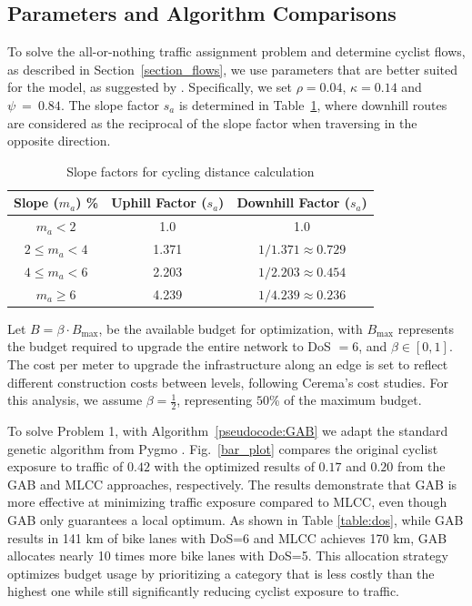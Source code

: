 \documentclass[letterpaper, 10 pt, conference]{ieeeconf}  %
\begin{document}
 \subsection{Parameters and Algorithm Comparisons}
To solve the all-or-nothing traffic assignment problem and determine cyclist flows, as described in Section~\ref{section_flows}, we use parameters that are better suited for the model, as suggested by \cite{cooper2017using}. Specifically, we set $\rho = 0.04$, $\kappa = 0.14$ and $\psi~=~0.84$. The slope factor $s_{a}$ is determined in Table~\ref{table:slope_factors}, where downhill routes are considered as the reciprocal of the slope factor when traversing in the opposite direction.
\begin{table}[h!]
\centering
\begin{tabular}{c|c|c}
\hline
Slope ($m_a$) \% & Uphill Factor ($s_a$) & Downhill Factor ($s_a$) \\ \hline
$m_a < 2$ & 1.0 & 1.0 \\ 
$2 \leq m_a < 4$ & 1.371 & $1/1.371 \approx 0.729$ \\ 
$4 \leq m_a < 6$ & 2.203 & $1/2.203 \approx 0.454$ \\ 
$m_a \geq 6$ & 4.239 & $1/4.239 \approx 0.236$ \\ \hline
\end{tabular}
\caption{\footnotesize Slope factors for cycling distance calculation}
\label{table:slope_factors}
\end{table}
 

 Let $B = \beta \cdot B_{\text{max}}$, be the available budget for optimization, with $B_{\text{max}}$ represents the budget required to upgrade the entire network to DoS $=6$, and $\beta \in \left [ 0,1\right]$. The cost per meter to upgrade the infrastructure along an edge is set to reflect different construction costs between levels, following Cerema's cost \cite{cerema2024_cost} studies. For this analysis, we assume $\beta = \frac{1}{2}$, representing $50$\% of the maximum budget. 

To solve Problem 1, with Algorithm~\ref{pseudocode:GAB} we adapt the standard genetic algorithm from Pygmo \cite{pygmo}. Fig.~\ref{bar_plot} compares the original cyclist exposure to traffic of $0.42$ with the optimized results of $0.17$ and $0.20$ from the GAB and MLCC approaches, respectively. The results demonstrate that GAB is more effective at minimizing traffic exposure compared to MLCC, even though GAB only guarantees a local optimum. As shown in Table \ref{table:dos}, while GAB results in 141 km of bike lanes with DoS=6 and MLCC achieves 170 km, GAB allocates nearly 10 times more bike lanes with DoS=5. This allocation strategy optimizes budget usage by prioritizing a category that is less costly than the highest one while still significantly reducing cyclist exposure to traffic.
\end{document}
